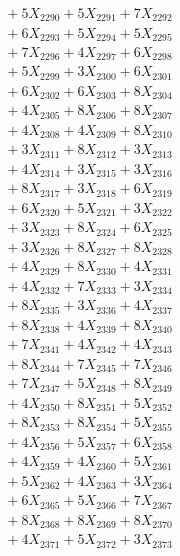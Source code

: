 \documentclass[a4paper,10pt]{article}
\begin{document}
{\begin{align}
&\;  + 5 X_{2290} + 5 X_{2291} + 7 X_{2292} \\[0.3ex]
&\;  + 6 X_{2293} + 5 X_{2294} + 5 X_{2295} \\[0.3ex]
&\;  + 7 X_{2296} + 4 X_{2297} + 6 X_{2298} \\[0.3ex]
&\;  + 5 X_{2299} + 3 X_{2300} + 6 X_{2301} \\[0.3ex]
&\;  + 6 X_{2302} + 6 X_{2303} + 8 X_{2304} \\[0.3ex]
&\;  + 4 X_{2305} + 8 X_{2306} + 8 X_{2307} \\[0.3ex]
&\;  + 4 X_{2308} + 4 X_{2309} + 8 X_{2310} \\[0.3ex]
&\;  + 3 X_{2311} + 8 X_{2312} + 3 X_{2313} \\[0.3ex]
&\;  + 4 X_{2314} + 3 X_{2315} + 3 X_{2316} \\[0.3ex]
&\;  + 8 X_{2317} + 3 X_{2318} + 6 X_{2319} \\[0.5ex]\allowbreak
&\;  + 6 X_{2320} + 5 X_{2321} + 3 X_{2322} \\[0.3ex]
&\;  + 3 X_{2323} + 8 X_{2324} + 6 X_{2325} \\[0.3ex]
&\;  + 3 X_{2326} + 8 X_{2327} + 8 X_{2328} \\[0.3ex]
&\;  + 4 X_{2329} + 8 X_{2330} + 4 X_{2331} \\[0.3ex]
&\;  + 4 X_{2332} + 7 X_{2333} + 3 X_{2334} \\[0.3ex]
&\;  + 8 X_{2335} + 3 X_{2336} + 4 X_{2337} \\[0.3ex]
&\;  + 8 X_{2338} + 4 X_{2339} + 8 X_{2340} \\[0.3ex]
&\;  + 7 X_{2341} + 4 X_{2342} + 4 X_{2343} \\[0.3ex]
&\;  + 8 X_{2344} + 7 X_{2345} + 7 X_{2346} \\[0.3ex]
&\;  + 7 X_{2347} + 5 X_{2348} + 8 X_{2349} \\[0.5ex]\allowbreak
&\;  + 4 X_{2350} + 8 X_{2351} + 5 X_{2352} \\[0.3ex]
&\;  + 8 X_{2353} + 8 X_{2354} + 5 X_{2355} \\[0.3ex]
&\;  + 4 X_{2356} + 5 X_{2357} + 6 X_{2358} \\[0.3ex]
&\;  + 4 X_{2359} + 4 X_{2360} + 5 X_{2361} \\[0.3ex]
&\;  + 5 X_{2362} + 4 X_{2363} + 3 X_{2364} \\[0.3ex]
&\;  + 6 X_{2365} + 5 X_{2366} + 7 X_{2367} \\[0.3ex]
&\;  + 8 X_{2368} + 8 X_{2369} + 8 X_{2370} \\[0.3ex]
&\;  + 4 X_{2371} + 5 X_{2372} + 3 X_{2373} \\[0.3ex]

\end{align}}
\end{document}

